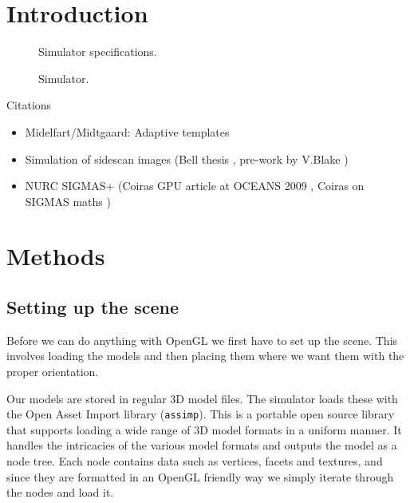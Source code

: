 \documentclass[
   UAM                                          %
 , 12pt                                         %
 , bibtex                                       %
 , layout
]{common/mytemplate}
\begin{document}
\section{Introduction}




\begin{figure}[t]\centering%
%
\caption{Simulator specifications.}\label{specs}%
\end{figure}

\begin{figure}[t]\centering%
%
\caption{Simulator.}\label{buildup}%
\end{figure}

Citations
\begin{itemize}
\item Midelfart/Midtgaard: Adaptive templates \cite{Midelfart2010}
\item Simulation of sidescan images (Bell thesis \cite{Bell1997}, pre-work by V.Blake \cite{Blake1993})
\item NURC SIGMAS+ (Coiras GPU article at OCEANS 2009 \cite{Coiras2009a}, Coiras on SIGMAS maths \cite{Coiras2009b})
\end{itemize}


\section{Methods}


\subsection{Setting up the scene}

Before we can do anything with OpenGL we first have to set up the scene. This involves loading the models and then placing them where we want them with the proper orientation. 

Our models are stored in regular 3D model files. The simulator loads these with the Open Asset Import library (\texttt{assimp}). This is a portable open source library that supports loading a wide range of 3D model formats in a uniform manner. It handles the intricacies of the various model formats and outputs the model as a node tree. Each node contains data such as vertices, facets and textures, and since they are formatted in an OpenGL friendly way we simply iterate through the nodes and load it.
\end{document}
